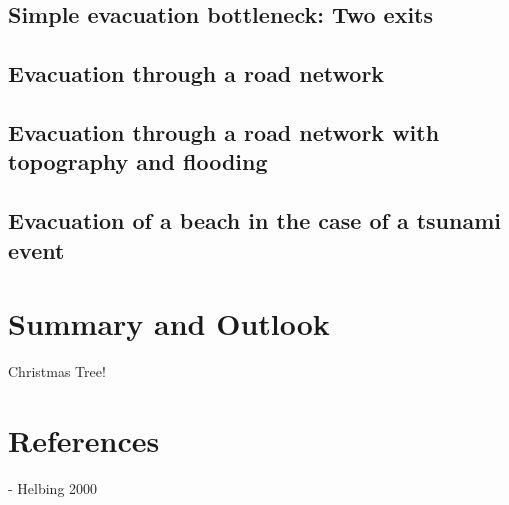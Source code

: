 \documentclass[11pt]{article}
\begin{document}
\subsection{Simple evacuation bottleneck: Two exits}
\subsection{Evacuation through a road network}
\subsection{Evacuation through a road network with topography and flooding}
\subsection{Evacuation of a beach in the case of a tsunami event}

\section{Summary and Outlook}

Christmas Tree!

\section{References}

- Helbing 2000
\end{document}
